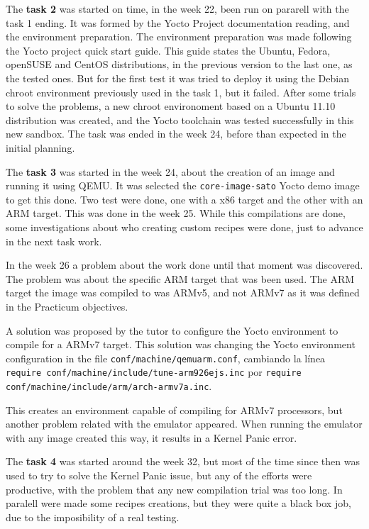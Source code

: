 \documentclass[a4paper,11pt,openany]{report}
\begin{document}
The \textbf{task 2} was started on time, in the week 22, been run on pararell with the task 1 ending. It was formed by the Yocto Project documentation reading, and the environment preparation.
The environment preparation was made following the Yocto project quick start guide\cite{yocto quick start}. This guide states the Ubuntu, Fedora, openSUSE and CentOS distributions, in the previous version to the last one, as the tested ones. But for the first test it was tried to deploy it using the Debian chroot environment previously used in the task 1, but it failed. After some trials to solve the problems, a new chroot environoment based on a Ubuntu 11.10 distribution was created, and the Yocto toolchain was tested successfully in this new sandbox. The task was ended in the week 24, before than expected in the initial planning.

The \textbf{task 3} was started in the week 24, about the creation of an image and running it using QEMU. It was selected the \verb#core-image-sato# Yocto demo image to get this done. Two test were done, one with a x86 target and the other with an ARM target. This was done in the week 25. While this compilations are done, some investigations about who creating custom recipes were done, just to advance in the next task work.

In the week 26 a problem about the work done until that moment was discovered. The problem was about the specific ARM target that was been used. The ARM target the image was compiled to was ARMv5, and not ARMv7 as it was defined in the Practicum objectives.

A solution was proposed by the tutor to configure the Yocto environment to compile for a ARMv7 target. This solution was changing the Yocto environment configuration in the file \verb#conf/machine/qemuarm.conf#, cambiando la línea \verb#require conf/machine/include/tune-arm926ejs.inc# por \verb#require conf/machine/include/arm/arch-armv7a.inc#.

This creates an environment capable of compiling for ARMv7 processors, but another problem related with the emulator appeared. When running the emulator with any image created this way, it results in a Kernel Panic error.

The \textbf{task 4} was started around the week 32, but most of the time since then was used to try to solve the Kernel Panic issue, but any of the efforts were productive, with the problem that any new compilation trial was too long. In paralell were made some recipes creations, but they were quite a black box job, due to the imposibility of a real testing.
\end{document}
